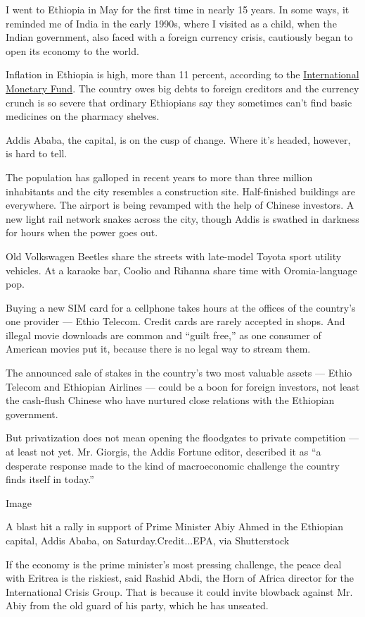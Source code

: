 I went to Ethiopia in May for the first time in nearly 15 years. In some
ways, it reminded me of India in the early 1990s, where I visited as a
child, when the Indian government, also faced with a foreign currency
crisis, cautiously began to open its economy to the world.

Inflation in Ethiopia is high, more than 11 percent, according to the
\href{http://www.imf.org/en/Countries/ETH\#countrydata}{International
Monetary Fund}. The country owes big debts to foreign creditors and the
currency crunch is so severe that ordinary Ethiopians say they sometimes
can't find basic medicines on the pharmacy shelves.

Addis Ababa, the capital, is on the cusp of change. Where it's headed,
however, is hard to tell.

The population has galloped in recent years to more than three million
inhabitants and the city resembles a construction site. Half-finished
buildings are everywhere. The airport is being revamped with the help of
Chinese investors. A new light rail network snakes across the city,
though Addis is swathed in darkness for hours when the power goes out.

Old Volkswagen Beetles share the streets with late-model Toyota sport
utility vehicles. At a karaoke bar, Coolio and Rihanna share time with
Oromia-language pop.

Buying a new SIM card for a cellphone takes hours at the offices of the
country's one provider --- Ethio Telecom. Credit cards are rarely
accepted in shops. And illegal movie downloads are common and ``guilt
free,'' as one consumer of American movies put it, because there is no
legal way to stream them.

The announced sale of stakes in the country's two most valuable assets
--- Ethio Telecom and Ethiopian Airlines --- could be a boon for foreign
investors, not least the cash-flush Chinese who have nurtured close
relations with the Ethiopian government.

But privatization does not mean opening the floodgates to private
competition --- at least not yet. Mr. Giorgis, the Addis Fortune editor,
described it as ``a desperate response made to the kind of macroeconomic
challenge the country finds itself in today.''

Image

A blast hit a rally in support of Prime Minister Abiy Ahmed in the
Ethiopian capital, Addis Ababa, on Saturday.Credit...EPA, via
Shutterstock

If the economy is the prime minister's most pressing challenge, the
peace deal with Eritrea is the riskiest, said Rashid Abdi, the Horn of
Africa director for the International Crisis Group. That is because it
could invite blowback against Mr. Abiy from the old guard of his party,
which he has unseated.

